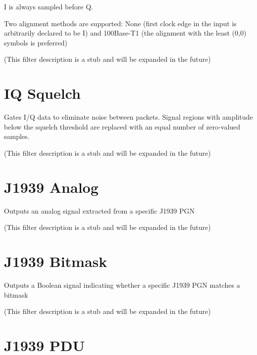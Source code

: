 I is always sampled before Q.

Two alignment methods are supported: None (first clock edge in the input is arbitrarily declared to be I)
and 100Base-T1 (the alignment with the least (0,0) symbols is preferred)

(This filter description is a stub and will be expanded in the future)

\pagebreak
\section{IQ Squelch}

Gates I/Q data to eliminate noise between packets. Signal regions with amplitude below the squelch threshold are
replaced with an equal number of zero-valued samples.

(This filter description is a stub and will be expanded in the future)

\pagebreak
\section{J1939 Analog}
\label{filter:j1939analog}

Outputs an analog signal extracted from a specific J1939 PGN

(This filter description is a stub and will be expanded in the future)

\pagebreak
\section{J1939 Bitmask}
\label{filter:j1939bitmask}

Outputs a Boolean signal indicating whether a specific J1939 PGN matches a bitmask

(This filter description is a stub and will be expanded in the future)

\pagebreak
\section{J1939 PDU}
\label{filter:j1939pdu}

